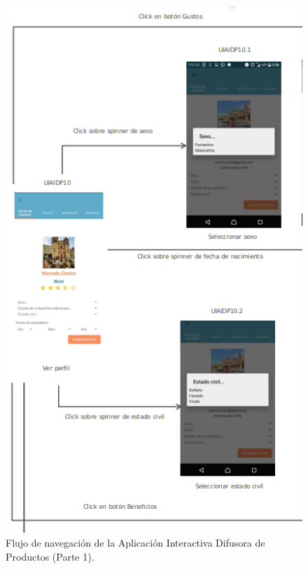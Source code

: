 \FloatBarrier
\begin{figure}[htbp!]
		\centering
			\includegraphics[width=.7 \textwidth]{imagenes/UI_userapp/mapNav2P1}
		\caption{Flujo de navegación de la Aplicación Interactiva Difusora de Productos (Parte 1).}
		\label{image:flujoNavegacionDifusoraDerivada2}
\end{figure}
\FloatBarrier

